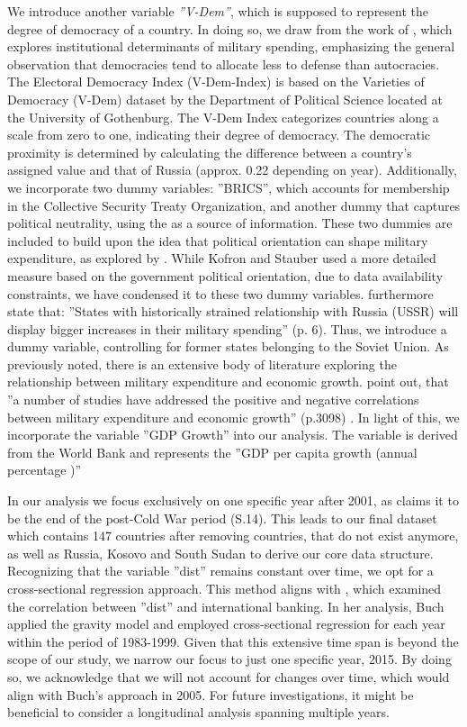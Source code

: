 \documentclass[12pt,a4paper]{article}
\begin{document}
We introduce another variable \textit{''V-Dem''}, which is supposed to represent the degree of democracy of a country. In doing so, we draw from the work of \citet{albalate2012}, which explores institutional determinants of military spending, emphasizing the general observation that democracies tend to allocate less to defense than autocracies. The Electoral Democracy Index (V-Dem-Index) is based on the Varieties of Democracy (V-Dem) dataset \citep{VDEM} by the Department of Political Science located at the University of Gothenburg. The V-Dem Index categorizes countries along a scale from zero to one, indicating their degree of democracy. The democratic proximity is determined by calculating the difference between a country’s assigned value and that of Russia (approx. 0.22 depending on year). Additionally, we incorporate two dummy variables: ''BRICS'', which accounts for membership in the Collective Security Treaty Organization, and another dummy that captures political neutrality, using the \citet{World} as a source of information. These two dummies are included to build upon the idea that political orientation can shape military expenditure, as explored by \citet{kofrovn2023}. While Kofron and Stauber used a more detailed measure based on the government political orientation, due to data availability constraints, we have condensed it to these two dummy variables. \citet{kofrovn2023} furthermore state that: ''States with historically strained relationship with Russia (USSR) will display bigger increases in their military spending'' (p. 6). Thus, we introduce a dummy variable, controlling for former states belonging to the Soviet Union. As previously noted, there is an extensive body of literature exploring the relationship between military expenditure and economic growth. \citet{lin2019} point out, that ''a number of studies have addressed the positive and negative correlations between military expenditure and economic growth'' (p.3098) . In light of this, we incorporate the variable ''GDP Growth'' into our analysis. The variable is derived from the World Bank and represents the ''GDP per capita growth (annual percentage )''


In our analysis we focus exclusively on one specific year after 2001, as \citet{gray2005} claims it to be the end of the post-Cold War period (S.14). This leads to our final dataset which contains 147 countries after removing countries, that do not exist anymore, as well as Russia, Kosovo and South Sudan to derive our core data structure. Recognizing that the variable ''dist'' remains constant over time, we opt for a cross-sectional regression approach. This method aligns with \citet{buch2005}, which examined the correlation between ''dist'' and international banking. In her analysis, Buch applied the gravity model and employed cross-sectional regression for each year within the period of 1983-1999. Given that this extensive time span is beyond the scope of our study, we narrow our focus to just one specific year, 2015. By doing so, we acknowledge that we will not account for changes over time, which would align with Buch's approach in 2005. For future investigations, it might be beneficial to consider a longitudinal analysis spanning multiple years. 
\end{document}
